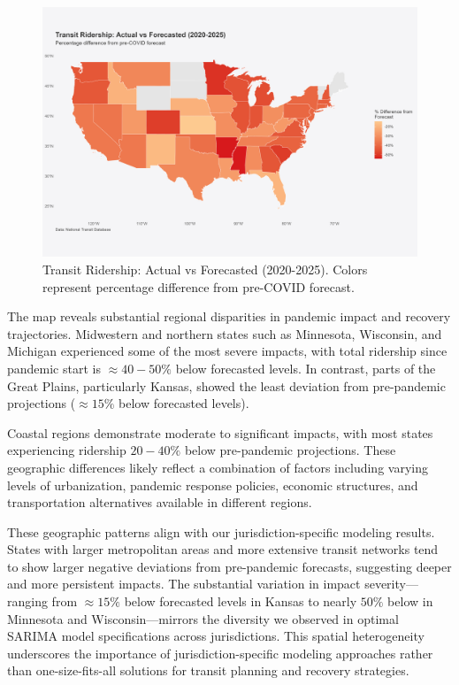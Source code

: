\documentclass[11pt]{article}
\begin{document}
\begin{figure}[!ht]
\centering
\includegraphics[width=\textwidth]{transit_ridership_map.png}
\caption{Transit Ridership: Actual vs Forecasted (2020-2025). Colors represent percentage difference from pre-COVID forecast.}
\label{fig:geographic_impact}
\end{figure}

The map reveals substantial regional disparities in pandemic impact and recovery trajectories. Midwestern and northern states such as Minnesota, Wisconsin, and Michigan experienced some of the most severe impacts, with total ridership since pandemic start is $\approx40-50\%$ below forecasted levels. In contrast, parts of the Great Plains, particularly Kansas, showed the least deviation from pre-pandemic projections ($\approx 15\%$ below forecasted levels).

Coastal regions demonstrate moderate to significant impacts, with most states experiencing ridership $20-40\%$ below pre-pandemic projections. These geographic differences likely reflect a combination of factors including varying levels of urbanization, pandemic response policies, economic structures, and transportation alternatives available in different regions.

These geographic patterns align with our jurisdiction-specific modeling results. States with larger metropolitan areas and more extensive transit networks tend to show larger negative deviations from pre-pandemic forecasts, suggesting deeper and more persistent impacts. The substantial variation in impact severity—ranging from $\approx15\%$ below forecasted levels in Kansas to nearly $50\%$ below in Minnesota and Wisconsin—mirrors the diversity we observed in optimal SARIMA model specifications across jurisdictions. This spatial heterogeneity underscores the importance of jurisdiction-specific modeling approaches rather than one-size-fits-all solutions for transit planning and recovery strategies.
\end{document}
